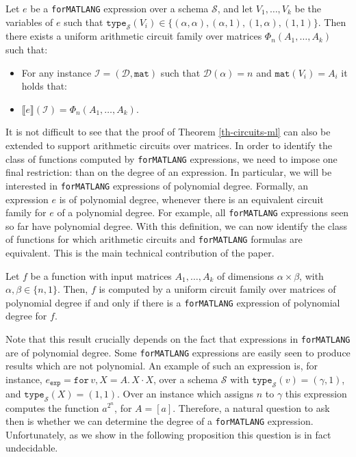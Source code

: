 \documentclass[sigconf]{acmart}
\newcommand{\sem}[2]{\llbracket #1 \rrbracket(#2)}
\newcommand{\I}{\mathcal{I}}
\newcommand{\Sch}{\mathcal{S}}
\newcommand{\dom}{\mathcal{D}}
\newcommand{\conc}{\texttt{mat}}
\newcommand{\ttype}{\texttt{type}_{\Sch}}
\newcommand{\langfor}{\texttt{for}\text{-}\texttt{MATLANG}\xspace}
\newcommand{\ffor}[3]{\texttt{for}\, #1,#2 \texttt{.}\, #3}
\begin{document}
\begin{theorem}
\label{th-ml-to-circuits}
Let $e$ be a \langfor expression over a schema $\Sch$, and let $V_1,\ldots ,V_k$ be the variables of $e$ such that $\ttype(V_i)\in \{(\alpha,\alpha), (\alpha,1), (1,\alpha), (1,1)\}$. Then there exists a uniform arithmetic circuit family over matrices $\Phi_n(A_1,\ldots ,A_k)$ such that:
\begin{itemize}
\item For any instance $\I = (\dom,\conc)$ such that $\dom(\alpha) = n$ and $\conc(V_i) = A_i$ it holds that:
\item $\sem{e}{\I} = \Phi_n(A_1,\ldots ,A_k)$.
\end{itemize}
\end{theorem}

It is not difficult to see that the proof of Theorem \ref{th-circuits-ml} can also be extended to support arithmetic circuits over matrices. In order to identify the class of functions computed by \langfor expressions, we need to impose one final restriction: than on the degree of an expression. 
In particular, we will be interested in \langfor expressions of polynomial degree. Formally, an expression $e$ is of polynomial degree, whenever there is an equivalent circuit family for $e$ of a polynomial degree.  
For example, all \langfor expressions seen so far have polynomial degree.
With this definition, we can now identify the class of functions for which arithmetic circuits and \langfor formulas are equivalent. This is the main technical contribution of the paper. 

\begin{corollary}
\label{th-equivalence}
Let $f$ be a function with input matrices $A_1,\ldots ,A_k$ of dimensions $\alpha\times \beta$, with $\alpha,\beta \in \{n,1\}$. Then, $f$ is computed by a uniform circuit family over matrices of polynomial degree if and only if there is a \langfor expression of polynomial degree for $f$. 
\end{corollary}

Note that this result crucially depends on the fact that expressions in \langfor are of polynomial degree. Some \langfor expressions are easily seen to produce results which are not polynomial. An example of such an expression is, for instance, $e_{\texttt{exp}} = \ffor{v}{X=A}{X\cdot X}$, over a schema $\Sch$ with $\ttype(v)= (\gamma,1)$, and $\ttype(X)=(1,1)$. Over an instance which assigns $n$ to $\gamma$ this expression computes the function $a^{2^n}$, for $A=[a]$. Therefore, a natural question to ask then is whether we can determine the degree of a \langfor expression. Unfortunately, as we show in the following proposition this question is in fact undecidable.
\end{document}
